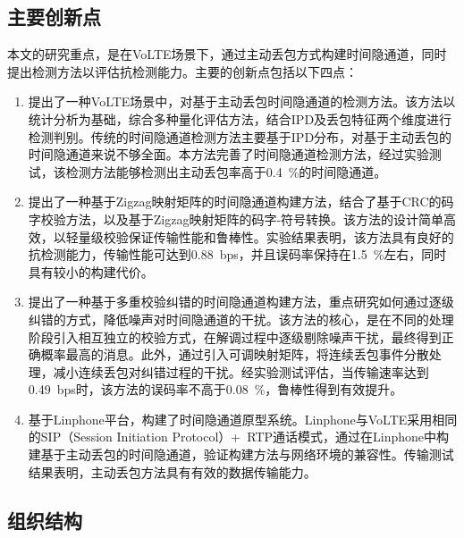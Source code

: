 \subsection{主要创新点}
\label{sec:intro:work:inno}

本文的研究重点，是在VoLTE场景下，通过主动丢包方式构建时间隐通道，同时提出检测方法以评估抗检测能力。主要的创新点包括以下四点：

\begin{enumerate}
    \item 提出了一种VoLTE场景中，对基于主动丢包时间隐通道的检测方法。该方法以统计分析为基础，综合多种量化评估方法，结合IPD及丢包特征两个维度进行检测判别。传统的时间隐通道检测方法主要基于IPD分布，对基于主动丢包的时间隐通道来说不够全面。本方法完善了时间隐通道检测方法，经过实验测试，该检测方法能够检测出主动丢包率高于{0.4\ \%}的时间隐通道。
    \item 提出了一种基于Zigzag映射矩阵的时间隐通道构建方法，结合了基于CRC的码字校验方法，以及基于Zigzag映射矩阵的码字-符号转换。该方法的设计简单高效，以轻量级校验保证传输性能和鲁棒性。实验结果表明，该方法具有良好的抗检测能力，传输性能可达到{0.88\ bps}，并且误码率保持在{1.5\ \%}左右，同时具有较小的构建代价。
    \item 提出了一种基于多重校验纠错的时间隐通道构建方法，重点研究如何通过逐级纠错的方式，降低噪声对时间隐通道的干扰。该方法的核心，是在不同的处理阶段引入相互独立的校验方式，在解调过程中逐级剔除噪声干扰，最终得到正确概率最高的消息。此外，通过引入可调映射矩阵，将连续丢包事件分散处理，减小连续丢包对纠错过程的干扰。经实验测试评估，当传输速率达到{0.49\ bps}时，该方法的误码率不高于{0.08\ \%}，鲁棒性得到有效提升。
    \item 基于Linphone平台，构建了时间隐通道原型系统。Linphone与VoLTE采用相同的SIP（Session Initiation Protocol）+\ RTP通话模式，通过在Linphone中构建基于主动丢包的时间隐通道，验证构建方法与网络环境的兼容性。传输测试结果表明，主动丢包方法具有有效的数据传输能力。
\end{enumerate}

\subsection{组织结构}
\label{sec:intro:work:struct}

